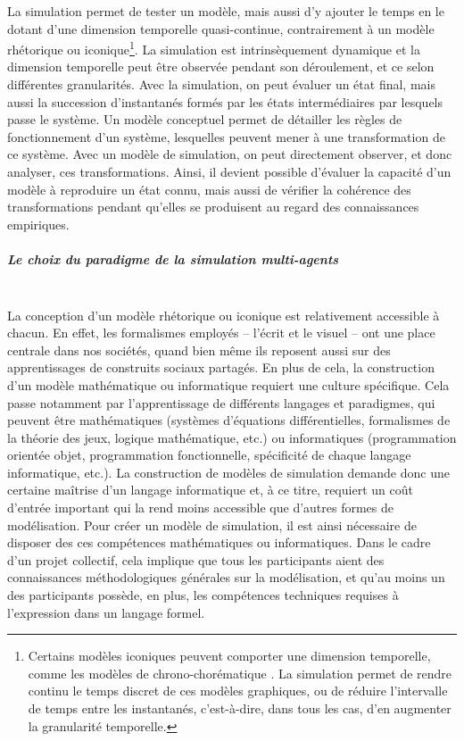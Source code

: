 La simulation permet de tester un modèle, mais aussi d'y ajouter le temps en le dotant d'une dimension temporelle quasi-continue, contrairement à un modèle \og rhétorique\fg{} ou \og iconique\fg{}\footnote{
	Certains modèles \og iconiques\fg{} peuvent comporter une dimension temporelle, comme les modèles de \og chrono-chorématique\fg{} \autocite{boissavit2005chrono,rodier2010dossier}.
	La simulation permet de rendre continu le temps discret de ces modèles graphiques, ou de réduire l'intervalle de temps entre les instantanés, c'est-à-dire, dans tous les cas, d'en augmenter la granularité temporelle. 
}.
La simulation est intrinsèquement dynamique et la dimension temporelle peut être observée pendant son déroulement, et ce selon différentes granularités.
Avec la simulation, on peut évaluer un état final, mais aussi la succession d'instantanés formés par les états intermédiaires par lesquels passe le système.
Un modèle conceptuel permet de détailler les règles de fonctionnement d'un système, lesquelles peuvent mener à une transformation de ce système.
Avec un modèle de simulation, on peut directement observer, et donc analyser, ces transformations.
Ainsi, il devient possible d'évaluer la capacité d'un modèle à reproduire un état connu, mais aussi de vérifier la cohérence des transformations pendant qu'elles se produisent au regard des connaissances empiriques.


\subparagraph{Le choix du paradigme de la simulation multi-agents}~\\

La conception d'un modèle \og rhétorique\fg{} ou \og iconique\fg{} est relativement accessible à chacun. 
En effet, les formalismes employés -- l'écrit et le visuel -- ont une place centrale dans nos sociétés, quand bien même ils reposent aussi sur des apprentissages de construits sociaux partagés.
En plus de cela, la construction d'un modèle mathématique ou informatique requiert une culture spécifique.
Cela passe notamment par l'apprentissage de différents \og langages\fg{} et paradigmes, qui peuvent être mathématiques (systèmes d'équations différentielles, formalismes de la théorie des jeux, logique mathématique, etc.) ou informatiques (programmation orientée objet, programmation fonctionnelle, spécificité de chaque langage informatique, etc.).
La construction de modèles de simulation demande donc une certaine maîtrise d'un langage informatique et, à ce titre, requiert un coût d'entrée important qui la rend moins accessible que d'autres formes de modélisation.
Pour créer un modèle de simulation, il est ainsi nécessaire de disposer des ces compétences mathématiques ou informatiques.
Dans le cadre d'un projet collectif, cela implique que tous les participants aient des connaissances méthodologiques générales sur la modélisation, et qu'au moins un des participants possède, en plus, les compétences techniques requises à l'expression dans un langage formel.

